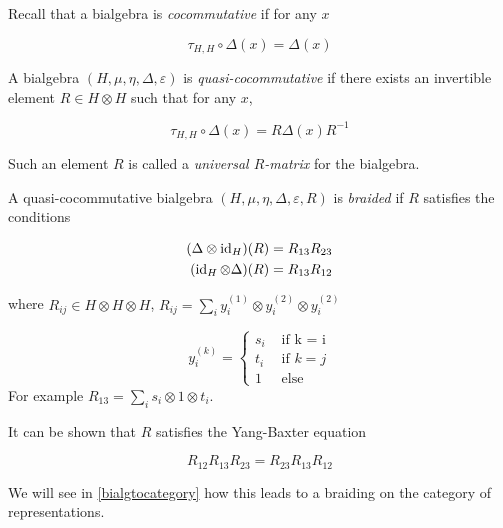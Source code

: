 Recall that a bialgebra is \emph{cocommutative} if for any $x$

\begin{equation}
    \tau_{H,H}\circ \Delta(x)  = \Delta(x)
\end{equation}

\begin{defn}
    A bialgebra $(H,\mu,\eta, \Delta, \varepsilon)$ is
    \emph{quasi-cocommutative} if there exists an invertible element $R \in H
    \otimes H$ such that for any $x$,

    \begin{equation}
        \tau_{H,H}\circ \Delta(x)  = R \Delta(x) R^{-1}
    \end{equation}
\end{defn}

Such an element $R$ is called a \emph{universal $R$-matrix} for the bialgebra. 

\begin{defn}
    \label{defn:braided}
    A quasi-cocommutative bialgebra $(H,\mu,\eta, \Delta, \varepsilon, R)$ is
    \emph{braided} if $R$ satisfies the conditions

    \begin{align}
        (\Delta \otimes \operatorname{id}_H)(R) = R_{13} R_{23} \\
        (\operatorname{id}_H \otimes \Delta)(R) = R_{13} R_{12} 
    \end{align}

    where $R_{ij} \in H \otimes H \otimes H$, $R_{ij} = \sum_{i} y_i^{(1)} \otimes y_{i}^{(2)} \otimes y_i^{(2)}$

    \begin{equation}
        y_i^{(k)} = \begin{cases} s_i & \text{ if k = i} \\
                                  t_i & \text{ if $k = j$} \\
                                  1   & \text{ else}
                    \end{cases}
    \end{equation}
    For example $R_{13} = \sum_{i} s_i \otimes 1 \otimes t_i$.

\end{defn}

It can be shown that $R$ satisfies the Yang-Baxter equation

\begin{equation}
    R_{12} R_{13} R_{23} = R_{23} R_{13} R_{12}
\end{equation}

We will see in \ref{bialgtocategory} how this leads to a braiding on the
category of representations.
